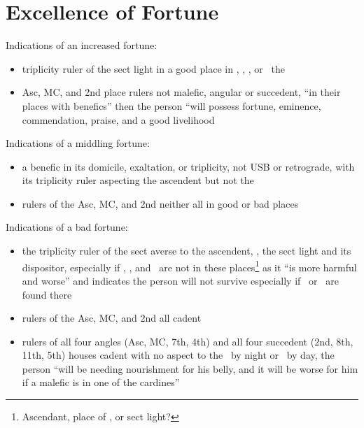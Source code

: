 \section{Excellence of Fortune}
Indications of an increased fortune:
\begin{itemize}[topsep=0em,itemsep=0em]
\item triplicity ruler of the sect light in a good place in \Conjunction, \Opposition, \Trine, or \Square\, the \Moon

\item Asc, MC, and 2nd place rulers not malefic, angular or succedent, ``in their places with benefics'' then the person ``will possess fortune, eminence, commendation, praise, and a good livelihood
\end{itemize}

Indications of a middling fortune:
\begin{itemize}[topsep=0em,itemsep=0em]
\item a benefic in its domicile, exaltation, or triplicity, not USB or retrograde, with its triplicity ruler aspecting the ascendent but not the \Moon

\item rulers of the Asc, MC, and 2nd neither all in good or bad places
\end{itemize}

Indications of a bad fortune:
\begin{itemize}[topsep=0em,itemsep=0em]
\item the triplicity ruler of the sect averse to the ascendent, \Moon, the sect light and its dispositor, especially if \Jupiter, \Venus, and \Mercury\, are not in these places\footnote{Ascendant, place of \Moon, or sect light?} as it ``is more harmful and worse'' and indicates the person will not survive especially if \Saturn\, or \Mars\, are found there

\item rulers of the Asc, MC, and 2nd all cadent

\item rulers of all four angles (Asc, MC, 7th, 4th) and all four succedent (2nd, 8th, 11th, 5th) houses cadent with no aspect to the \Moon\, by night or \Sun\, by day, the person ``will be needing nourishment for his belly, and it will be worse for him if a malefic is in one of the cardines''
\end{itemize}